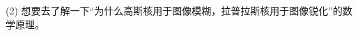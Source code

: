 \documentclass[letterpaper,12pt]{article}
\begin{document}
	(2) 想要去了解一下“为什么高斯核用于图像模糊，拉普拉斯核用于图像锐化”的数学原理。
	
	
	
	
\end{document}
